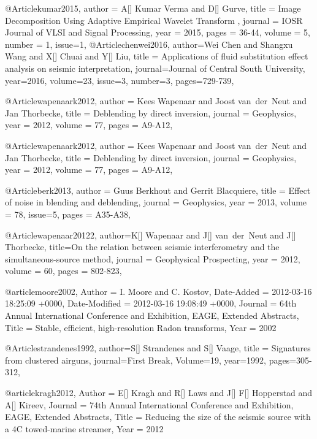 @Article{kumar2015,
  author = 	 {A[] Kumar Verma and D[] Gurve},
  title = 	 {Image Decomposition Using Adaptive Empirical Wavelet Transform  
},
  journal = 	 {IOSR Journal of VLSI and Signal Processing},
  year = 	 2015,
  pages =	 {36-44},
  volume =    {5},
  number =    {1},
  issue=1,
}
@Article{chenwei2016,
  author={Wei Chen and Shangxu Wang and X[] Chuai and Y[] Liu},
  title = {Applications of fluid substitution effect analysis on seismic interpretation},
  journal={Journal of Central South University},
  year=2016,
  volume=23,
  issue=3,
  number=3,
  pages={729-739},
}

@Article{wapenaark2012,
  author = 	 {Kees Wapenaar and Joost van~der~Neut and Jan Thorbecke},
  title = 	 {Deblending by direct inversion},
  journal = 	 {Geophysics},
  year = 	 2012,
  volume =	 77,
  pages =	 {A9-A12},
}

@Article{wapenaark2012,
  author = 	 {Kees Wapenaar and Joost van~der~Neut and Jan Thorbecke},
  title = 	 {Deblending by direct inversion},
  journal = 	 {Geophysics},
  year = 	 2012,
  volume =	 77,
  pages =	 {A9-A12},
}

@Article{berk2013,
  author = 	 {Guus Berkhout and Gerrit Blacquiere},
  title = 	 {Effect of noise in blending and deblending},
  journal = 	 {Geophysics},
  year = 	 2013,
  volume =	 78,
  issue=5,
  pages =	 {A35-A38},
}


@Article{wapenaar20122,
  author={K[] Wapenaar and J[] van~der~Neut and J[] Thorbecke},
  title={On the relation between seismic interferometry and the simultaneous-source method},
  journal = 	 {Geophysical Prospecting},
  year = 	 2012,
  volume =	 60,
  pages =	 {802-823},
}

@article{moore2002,
	Author = {I. Moore and C. Kostov},
	Date-Added = {2012-03-16 18:25:09 +0000},
	Date-Modified = {2012-03-16 19:08:49 +0000},
	Journal = {64th Annual International Conference and Exhibition, EAGE, Extended Abstracts},
	Title = {Stable, efficient, high-resolution {R}adon transforms},
	Year = {2002}}

@Article{strandenes1992,
  author={S[] Strandenes and S[] Vaage},
  title = {Signatures from clustered airguns},
  journal={First Break},
  Volume=19,
  year=1992,
  pages={305-312},
}

@article{kragh2012,
	Author = {E[] Kragh and R[] Laws and J[] F[] Hopperstad and A[] Kireev},
	Journal = {74th Annual International Conference and Exhibition, EAGE, Extended Abstracts},
	Title = {Reducing the size of the seismic source with a 4C towed-marine streamer},
	Year = {2012}}


